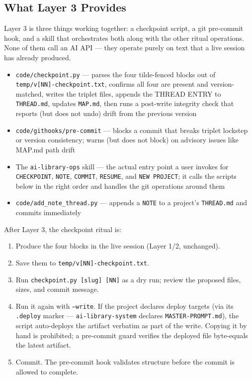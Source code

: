 \documentclass[12pt,letterpaper]{article}
\begin{document}
\subsection{What Layer 3 Provides}

Layer 3 is three things working together: a checkpoint script, a git
pre-commit hook, and a skill that orchestrates both along with the
other ritual operations. None of them call an AI API --- they operate
purely on text that a live session has already produced.

\begin{itemize}
  \item \texttt{code/checkpoint.py} --- parses the four tilde-fenced
        blocks out of \texttt{temp/v[NN]-checkpoint.txt}, confirms all
        four are present and version-matched, writes the triplet files,
        appends the THREAD ENTRY to \texttt{THREAD.md}, updates
        \texttt{MAP.md}, then runs a post-write integrity check that
        reports (but does not undo) drift from the previous version
  \item \texttt{code/githooks/pre-commit} --- blocks a commit that
        breaks triplet lockstep or version consistency; warns (but does
        not block) on advisory issues like MAP.md path drift
  \item The \texttt{ai-library-ops} skill --- the actual entry point a
        user invokes for \texttt{CHECKPOINT}, \texttt{NOTE},
        \texttt{COMMIT}, \texttt{RESUME}, and \texttt{NEW PROJECT};
        it calls the scripts below in the right order and handles the
        git operations around them
  \item \texttt{code/add\_note\_thread.py} --- appends a \texttt{NOTE}
        to a project's \texttt{THREAD.md} and commits immediately
\end{itemize}

After Layer 3, the checkpoint ritual is:

\begin{enumerate}
  \item Produce the four blocks in the live session (Layer 1/2, unchanged).
  \item Save them to \texttt{temp/v[NN]-checkpoint.txt}.
  \item Run \texttt{checkpoint.py [slug] [NN]} as a dry run; review the
        proposed files, sizes, and commit message.
  \item Run it again with \texttt{--write}. If the project declares
        deploy targets (via its \texttt{.deploy} marker ---
        \texttt{ai-library-system} declares \texttt{MASTER-PROMPT.md}),
        the script auto-deploys the artifact verbatim as part of the
        write. Copying it by hand is prohibited; a pre-commit guard
        verifies the deployed file byte-equals the latest artifact.
  \item Commit. The pre-commit hook validates structure before the
        commit is allowed to complete.
\end{enumerate}
\end{document}
